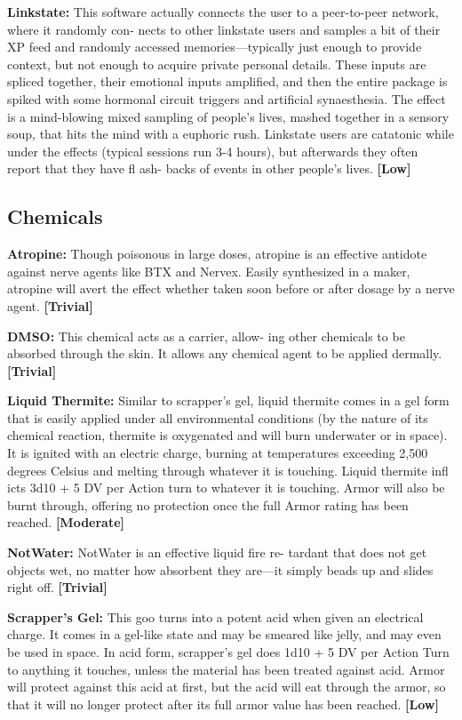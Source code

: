 \textbf{Linkstate:} This software actually connects the user 
to a peer-to-peer network, where it randomly con-
nects to other linkstate users and samples a bit of their 
XP feed and randomly accessed memories—typically 
just enough to provide context, but not enough to 
acquire private personal details. These inputs are 
spliced together, their emotional inputs amplified, and 
then the entire package is spiked with some hormonal 
circuit triggers and artificial synaesthesia. The effect 
is a mind-blowing mixed sampling of people's lives, 
mashed together in a sensory soup, that hits the mind 
with a euphoric rush. Linkstate users are catatonic 
while under the effects (typical sessions run 3-4 hours), 
but afterwards they often report that they have fl ash-
backs of events in other people's lives. \textbf{[Low]}

\subsection{Chemicals}

\textbf{Atropine:} Though poisonous in large doses, atropine 
is an effective antidote against nerve agents like BTX
and Nervex. Easily synthesized in a maker, atropine 
will avert the effect whether taken soon before or after 
dosage by a nerve agent. \textbf{[Trivial]}

\textbf{DMSO:} This chemical acts as a carrier, allow-
ing other chemicals to be absorbed through the 
skin. It allows any chemical agent to be applied 
dermally. \textbf{[Trivial]}

\textbf{Liquid Thermite:} Similar to scrapper's gel, liquid 
thermite comes in a gel form that is easily applied 
under all environmental conditions (by the nature 
of its chemical reaction, thermite is oxygenated and 
will burn underwater or in space). It is ignited with 
an electric charge, burning at temperatures exceeding 
2,500 degrees Celsius and melting through whatever 
it is touching. Liquid thermite infl icts 3d10 + 5 DV per 
Action turn to whatever it is touching. Armor will also 
be burnt through, offering no protection once the full 
Armor rating has been reached. \textbf{[Moderate]}

\textbf{NotWater:} NotWater is an effective liquid fire re-
tardant that does not get objects wet, no matter how 
absorbent they are—it simply beads up and slides 
right off. \textbf{[Trivial]}

\textbf{Scrapper's Gel:} This goo turns into a potent acid 
when given an electrical charge. It comes in a gel-like 
state and may be smeared like jelly, and may even be 
used in space. In acid form, scrapper's gel does 1d10 
+ 5 DV per Action Turn to anything it touches, unless 
the material has been treated against acid. Armor will 
protect against this acid at first, but the acid will eat 
through the armor, so that it will no longer protect 
after its full armor value has been reached. \textbf{[Low]}

